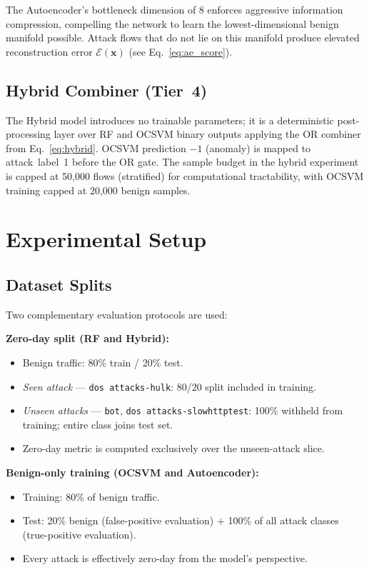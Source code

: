 \documentclass[10pt,conference]{IEEEtran}
\begin{document}
The Autoencoder's bottleneck dimension of 8 enforces aggressive
information compression, compelling the network to learn the
lowest-dimensional benign manifold possible. Attack flows that
do not lie on this manifold produce elevated reconstruction error
$\mathcal{E}(\mathbf{x})$ (see Eq.~\ref{eq:ae_score}).

\subsection{Hybrid Combiner (Tier~4)}

The Hybrid model introduces no trainable parameters; it is a
deterministic post-processing layer over RF and OCSVM binary
outputs applying the OR combiner from Eq.~\ref{eq:hybrid}.
OCSVM prediction $-1$ (anomaly) is mapped to attack~label~1 before
the OR gate. The sample budget in the hybrid experiment is
capped at 50{,}000 flows (stratified) for computational tractability,
with OCSVM training capped at 20{,}000 benign samples.

\section{Experimental Setup}
\label{sec:setup}

\subsection{Dataset Splits}

Two complementary evaluation protocols are used:

\textbf{Zero-day split (RF and Hybrid):}
\begin{itemize}[leftmargin=*,noitemsep]
  \item Benign traffic: 80\% train / 20\% test.
  \item \textit{Seen attack} — \texttt{dos~attacks-hulk}: 80/20 split
        included in training.
  \item \textit{Unseen attacks} — \texttt{bot},
        \texttt{dos~attacks-slowhttptest}: 100\% withheld from
        training; entire class joins test set.
  \item Zero-day metric is computed exclusively over the unseen-attack
        slice.
\end{itemize}

\textbf{Benign-only training (OCSVM and Autoencoder):}
\begin{itemize}[leftmargin=*,noitemsep]
  \item Training: 80\% of benign traffic.
  \item Test: 20\% benign (false-positive evaluation) + 100\% of
        all attack classes (true-positive evaluation).
  \item Every attack is effectively zero-day from the model's
        perspective.
\end{itemize}
\end{document}
